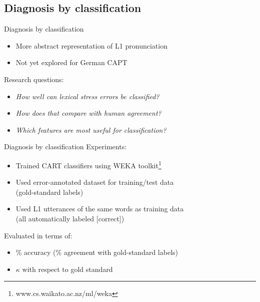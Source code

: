 \documentclass[xcolor={dvipsnames}]{beamer}
\newcommand{\TODO}[1]{{\color{red}\textbf{[TODO #1]}}}
\begin{document}
		
		
	\subsection{Diagnosis by classification}
		\begin{frame}{Diagnosis by classification}
		\begin{itemize}
		\item More abstract representation of L1 pronunciation
		\item Not yet explored for German CAPT
		\end{itemize}
		\vfill
		Research questions:
		\begin{itemize}
		\item \textit{How well can lexical stress errors be classified?}
		\item \textit{How does that compare with human agreement?}
		\item \textit{Which features are most useful for classification?}
		\end{itemize}	
		\end{frame}	
		
		\begin{frame}{Diagnosis by classification}
		Experiments:
		\begin{itemize}
		\item Trained CART classifiers using WEKA toolkit\footnote{www.cs.waikato.ac.nz/ml/weka}
		\item Used error-annotated dataset for training/test data\\(gold-standard labels)
		\item Used L1 utterances of the same words as training data \\(all automatically labeled [correct])
		\end{itemize}
		
		\vfill
		
		Evaluated in terms of:
		\begin{itemize}
		\item \% accuracy (\% agreement with gold-standard labels) 
		\item $\kappa$ with respect to gold standard
		\end{itemize}
		
		\end{frame}
\end{document}
